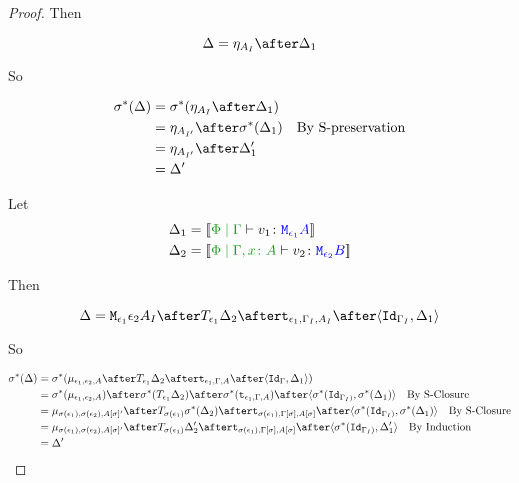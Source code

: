 \documentclass{report}
\begin{document}
\begin{framed}
\begin{proof}
    Then
    
    \begin{equation}
        \D = \point{A_I}\after \D_1\\
    \end{equation}
    
    So
    
    \begin{align*}
        \si\star(\D) &= \si\star(\point{A_I}\after \D_1)\\
                & = \point{A_{I'}} \after\si\star(\D_1)\qt{By S-preservation}\\
                & = \point{A_{I'}} \after\D_1'\\
                & = \D'
    \end{align*}
    
    \case{\vbind}
    Let \begin{align*}
        \D_1 &= \deno{\gpetyperelation{v_1}{\M{\e_1}{A}}}\\
        \D_2 &= \deno{\etyperelation{\P}{\gax}{v_2}{\M{\e_2}{B}}}
    \end{align*}
    
    Then
    
    \begin{equation}
        \D = \M{\e_1}{\e_2}{A_I}\after\T{\e_1}{\D_2}\after\tstrength{\e_1}{\G_I}{A_I}\after\pr{\Id{\G_{I}}}{\D_1}\\
    \end{equation}
    
    So
    
    \begin{align*}
        \si\star(\D) &= \si\star(\bind{\e_1}{\e_2}{A}\after\T{\e_1}{\D_2}\after\tstrength{\e_1}{\G}{A}\after\pr{\Id{\G}}{\D_1})\\
        & = \si\star(\bind{\e_1}{\e_2}{A})\after\si\star(\T{\e_1}{\D_2})\after\si\star(\tstrength{\e_1}{\G}{A})\after\pr{\si\star(\Id{\G_{I})}}{\si\star(\D_1)}\qt{By S-Closure}\\
        &= \bind{\si(\e_1)}{\si(\e_2)}{A\ssi'}\after\T{\si(\e_1)}{\si\star(\D_2)}\after\tstrength{\si(\e_1)}{\G\ssi}{A\ssi}\after\pr{\si\star(\Id{\G_{I})}}{\si\star(\D_1)}\qt{By S-Closure}\\
        &= \bind{\si(\e_1)}{\si(\e_2)}{A\ssi'}\after\T{\si(\e_1)}{\D_2'}\after\tstrength{\si(\e_1)}{\G\ssi}{A\ssi}\after\pr{\si\star(\Id{\G_{I})}}{\D_1'}\qt{By Induction}\\
        &= \D'\\
    \end{align*}
    

\end{proof}
\end{framed}
\end{document}
